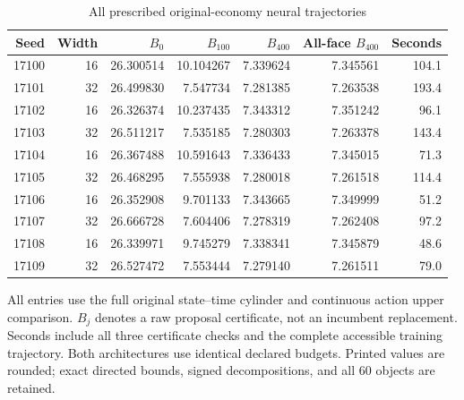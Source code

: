 \begin{table}[t]
\centering\small
\caption{All prescribed original-economy neural trajectories}\label{tab:r18neural}
\begin{tabular}{rrrrrrr}
\toprule
Seed & Width & $B_0$ & $B_{100}$ & $B_{400}$ & All-face $B_{400}$ & Seconds\\
\midrule
17100 & 16 & 26.300514 & 10.104267 & 7.339624 & 7.345561 & 104.1\\
17101 & 32 & 26.499830 & 7.547734 & 7.281385 & 7.263538 & 193.4\\
17102 & 16 & 26.326374 & 10.237435 & 7.343312 & 7.351242 & 96.1\\
17103 & 32 & 26.511217 & 7.535185 & 7.280303 & 7.263378 & 143.4\\
17104 & 16 & 26.367488 & 10.591643 & 7.336433 & 7.345015 & 71.3\\
17105 & 32 & 26.468295 & 7.555938 & 7.280018 & 7.261518 & 114.4\\
17106 & 16 & 26.352908 & 9.701133 & 7.343665 & 7.349999 & 51.2\\
17107 & 32 & 26.666728 & 7.604406 & 7.278319 & 7.262408 & 97.2\\
17108 & 16 & 26.339971 & 9.745279 & 7.338341 & 7.345879 & 48.6\\
17109 & 32 & 26.527472 & 7.553444 & 7.279140 & 7.261511 & 79.0\\
\bottomrule
\end{tabular}
\par\smallskip\begin{minipage}{.98\linewidth}\footnotesize All entries use the full original state--time cylinder and continuous action upper comparison. $B_j$ denotes a raw proposal certificate, not an incumbent replacement. Seconds include all three certificate checks and the complete accessible training trajectory. Both architectures use identical declared budgets. Printed values are rounded; exact directed bounds, signed decompositions, and all 60 objects are retained.\end{minipage}
\end{table}
